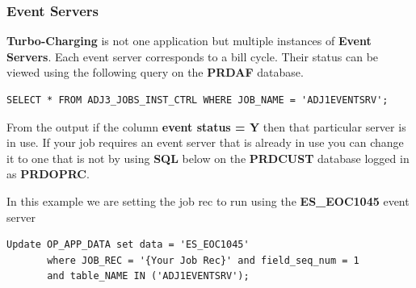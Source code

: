 \documentclass[12pt,twoside]{article}
\begin{document}
\subsubsection{Event Servers}
\label{sec:orgheadline3}
\textbf{Turbo-Charging} is not one application but multiple instances of \textbf{Event Servers}. Each event server corresponds to a bill cycle. Their status can be viewed using
     the following query on the \textbf{PRDAF} database.

\begin{verbatim}
SELECT * FROM ADJ3_JOBS_INST_CTRL WHERE JOB_NAME = 'ADJ1EVENTSRV';
\end{verbatim}

From the output if the column \textbf{event status = Y} then that
particular server is in use. If your job requires an event
server that is already in use you can change it to one that is
not by using \textbf{SQL} below on the \textbf{PRDCUST} database logged in as
\textbf{PRDOPRC}.

In this example we are setting the job rec to run using the
\textbf{ES\_EOC1045} event server

\begin{verbatim}
Update OP_APP_DATA set data = 'ES_EOC1045'
       where JOB_REC = '{Your Job Rec}' and field_seq_num = 1 
       and table_NAME IN ('ADJ1EVENTSRV');
\end{verbatim}
\end{document}
